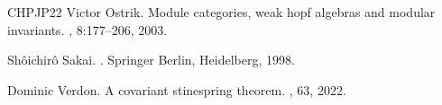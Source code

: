 \documentclass[11pt,reqno]{amsart}
\numberwithin{equation}{section}
\theoremstyle{plain}
\begin{document}
\begin{thebibliography}{CHPJP22}
Victor Ostrik.
\newblock Module categories, weak hopf algebras and modular invariants.
, 8:177--206, 2003.

Sh\^{o}ichir\^{o} Sakai.
.
\newblock Springer Berlin, Heidelberg, 1998.

Dominic Verdon.
\newblock A covariant stinespring theorem.
, 63, 2022.

\end{thebibliography}
\end{document}

